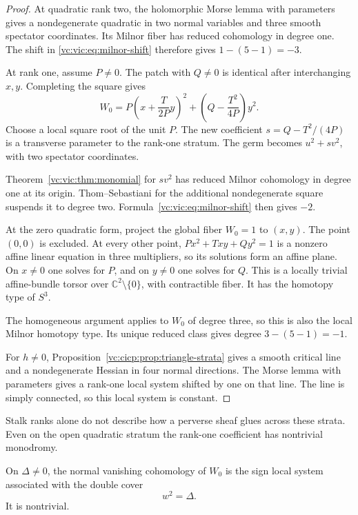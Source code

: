 \begin{proof}
At quadratic rank two, the holomorphic Morse lemma with
parameters gives a nondegenerate quadratic in two normal
variables and three smooth spectator coordinates.
Its Milnor fiber has reduced cohomology in degree one.
The shift in \eqref{vc:vic:eq:milnor-shift} therefore gives
$1-(5-1)=-3$.

At rank one, assume $P\ne0$. The patch with $Q\ne0$ is
identical after interchanging $x,y$. Completing the square gives
\[
 W_0=P\left(x+\frac{T}{2P}y\right)^2
              +\left(Q-\frac{T^2}{4P}\right)y^2.
\]
Choose a local square root of the unit $P$. The new coefficient
$s=Q-T^2/(4P)$ is a transverse parameter to the rank-one
stratum. The germ becomes $u^2+sv^2$, with two spectator
coordinates.

Theorem~\ref{vc:vic:thm:monomial} for $sv^2$
has reduced Milnor cohomology in degree one at its origin.
Thom--Sebastiani for the additional nondegenerate square
suspends it to degree two. Formula~\eqref{vc:vic:eq:milnor-shift}
then gives $-2$.

At the zero quadratic form, project the global fiber $W_0=1$
to $(x,y)$. The point $(0,0)$ is excluded. At every other
point, $P x^2+Txy+Qy^2=1$ is a nonzero affine linear
equation in three multipliers, so its solutions form an
affine plane. On $x\ne0$ one solves for $P$, and on $y\ne0$
one solves for $Q$. This is a locally trivial affine-bundle
torsor over $\mathbb C^2\setminus\{0\}$, with contractible
fiber. It has the homotopy type of $S^3$.

The homogeneous argument applies to $W_0$ of degree three,
so this is also the local Milnor homotopy type. Its unique
reduced class gives degree $3-(5-1)=-1$.

For $h\ne0$, Proposition~\ref{vc:cicp:prop:triangle-strata}
gives a smooth critical line and a nondegenerate Hessian
in four normal directions. The Morse lemma with parameters
gives a rank-one local system shifted by one on that line.
The line is simply connected, so this local system is constant.
\end{proof}

Stalk ranks alone do not describe how a perverse sheaf glues
across these strata. Even on the open quadratic stratum the
rank-one coefficient has nontrivial monodromy.

\begin{proposition}\label{vc:vic:prop:determinant-cover}
On $\Delta\ne0$, the normal vanishing cohomology of $W_0$ is the
sign local system associated with the double cover
\begin{equation}\label{vc:vic:eq:determinant-cover}
 w^2=\Delta.
\end{equation}
It is nontrivial.
\end{proposition}

